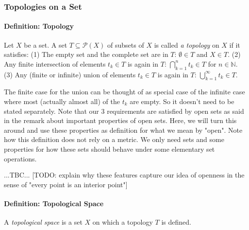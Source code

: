 
\subsubsection{Topologies on a Set}

\paragraph{Definition: Topology} 
Let $X$ be a set. A set $T \subseteq \mathcal{P}(X)$ of subsets of $X$ is called \emph{a topology} on $X$ if it satisfies: (1) The empty set and the complete set are in $T$: $\emptyset \in T$ and $X \in T$. (2) Any finite intersection of elements $t_k \in T$ is again in $T$: $\bigcap_{k=1}^n t_k \in T$ for $n \in \mathbb{N}$. (3) Any (finite or infinite) union of elements $t_k \in T$ is again in $T$: $\bigcup_{k=1}^\infty t_k \in T$. 

\medskip
The finite case for the union can be thought of as special case of the infinite case where most (actually almost all) of the $t_k$ are empty. So it doesn't need to be stated separately. Note that our 3 requirements are satisfied by open sets as said in the remark about important properties of open sets. Here, we will turn this around and use these properties as definition for what we mean by "open". Note how this definition does not rely on a metric. We only need sets and some properties for how these sets should behave under some elementary set operations.

...TBC... [TODO: explain why these features capture our idea of openness in the sense of "every point is an interior point"]





\paragraph{Definition: Topological Space} A \emph{topological space} is a set $X$ on which a topology $T$ is defined.

